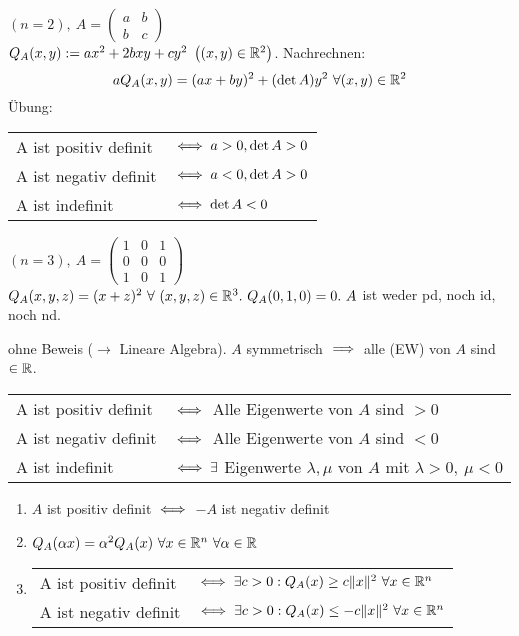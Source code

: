 \documentclass[a4paper,oneside,DIV15,BCOR12mm,chapterprefix=true,headings=onelinechapter]{scrbook}
\begin{document}
\begin{beispiele}
\item $(n=2),\ A=\left(\begin{smallmatrix}a&b\\b&c\end{smallmatrix}\right)$\\
$Q_A(x,y):=ax^2+2bxy+cy^2\ \left((x,y)\in\MdR^2\right)$. Nachrechnen:\\
$$aQ_A(x,y)=(ax+by)^2+(\det A)y^2\ \forall (x,y)\in\mathbb{R}^2$$ Übung:\\
\begin{tabular}{ll}
A ist positiv definit & $\iff a>0, \det A>0$\\
A ist negativ definit & $\iff a<0, \det A>0$\\
A ist indefinit& $\iff \det A<0$
\end{tabular}
\item $(n=3),\ A=\left(\begin{smallmatrix}1&0&1\\0&0&0\\1&0&1\end{smallmatrix}\right)$\\
$Q_A(x,y,z)=(x+z)^2\ \forall\ (x,y,z)\in\MdR^3.\ Q_A(0,1,0)=0.\ A$ ist weder pd, noch id, noch nd.
\item ohne Beweis ($\to$ Lineare Algebra). $A$ symmetrisch $\implies$ alle  (EW) von $A$ sind $\in\mathbb{R}$.\\
\begin{tabular}{ll}
A ist positiv definit & $\iff$ Alle Eigenwerte von $A$ sind $>0$\\
A ist negativ definit & $\iff$ Alle Eigenwerte von $A$ sind $<0$\\
A ist indefinit& $\iff \exists$ Eigenwerte $\lambda, \mu$ von $A$ mit $\lambda>0,\ \mu<0$
\end{tabular}
\end{beispiele}

\begin{satz}
\begin{enumerate}
\item $A$ ist positiv definit $\iff$ $-A$ ist negativ definit
\item $Q_A(\alpha x)=\alpha^2Q_A(x)\ \forall x\in\mathbb{R}^n\ \forall \alpha\in\mathbb{R}$
\item \begin{tabular}{ll}
A ist positiv definit & $\iff \exists c>0: Q_A(x)\ge c\|x\|^2\ \forall x\in\mathbb{R}^n$\\
A ist negativ definit & $\iff \exists c>0: Q_A(x)\le -c\|x\|^2\ \forall x\in\mathbb{R}^n$
\end{tabular}
\end{enumerate}
\end{satz}
\end{document}
